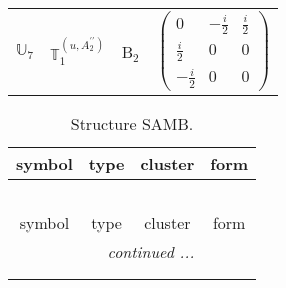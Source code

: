\documentclass[fleqn,10pt,landscape]{article}
\begin{document}
\begin{itemize}
\begin{center}
\begin{longtable}{c|c|c|c}
$ \mathbb{U}_{7} $ & $\mathbb{T}_{1}^{(u,A_{2}^{\prime\prime})}$ & B$_{2}$ & $\begin{pmatrix} 0 & - \frac{i}{2} & \frac{i}{2} \\ \frac{i}{2} & 0 & 0 \\ - \frac{i}{2} & 0 & 0 \end{pmatrix}$ \\
\end{longtable}
\end{center}
\begin{center}
\renewcommand{\arraystretch}{1.3}
\begin{longtable}{c|c|c|c}
\caption{Structure SAMB.}
 \\
 \hline \hline
symbol & type & cluster & form \\ \hline \endfirsthead

\multicolumn{3}{l}{\tablename\ \thetable{}} \\
 \hline \hline
symbol & type & cluster & form \\ \hline \endhead

 \hline \hline
\multicolumn{3}{r}{\footnotesize\it continued ...} \\ \endfoot

 \hline \hline
\multicolumn{3}{r}{} \\ \endlastfoot


\end{longtable}
\end{center}
\end{itemize}
\end{document}
